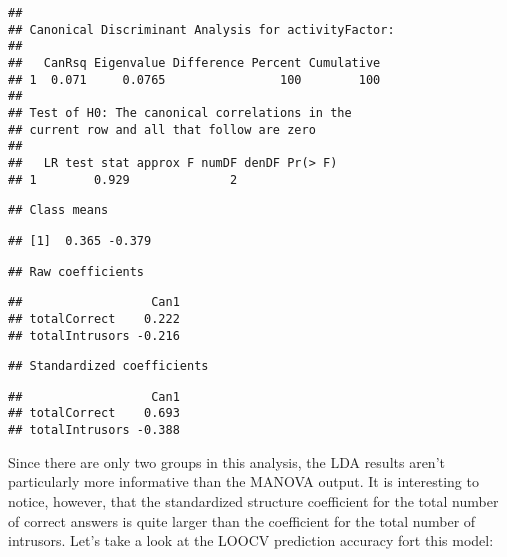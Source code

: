 \documentclass[11pt,]{article}
\begin{document}
\begin{verbatim}
## 
## Canonical Discriminant Analysis for activityFactor:
## 
##   CanRsq Eigenvalue Difference Percent Cumulative
## 1  0.071     0.0765                100        100
## 
## Test of H0: The canonical correlations in the 
## current row and all that follow are zero
## 
##   LR test stat approx F numDF denDF Pr(> F)
## 1        0.929              2
\end{verbatim}

\begin{verbatim}
## Class means
\end{verbatim}

\begin{verbatim}
## [1]  0.365 -0.379
\end{verbatim}

\begin{verbatim}
## Raw coefficients
\end{verbatim}

\begin{verbatim}
##                  Can1
## totalCorrect    0.222
## totalIntrusors -0.216
\end{verbatim}

\begin{verbatim}
## Standardized coefficients
\end{verbatim}

\begin{verbatim}
##                  Can1
## totalCorrect    0.693
## totalIntrusors -0.388
\end{verbatim}

Since there are only two groups in this analysis, the LDA results aren't
particularly more informative than the MANOVA output. It is interesting
to notice, however, that the standardized structure coefficient for the
total number of correct answers is quite larger than the coefficient for
the total number of intrusors. Let's take a look at the LOOCV prediction
accuracy fort this model:
\end{document}
